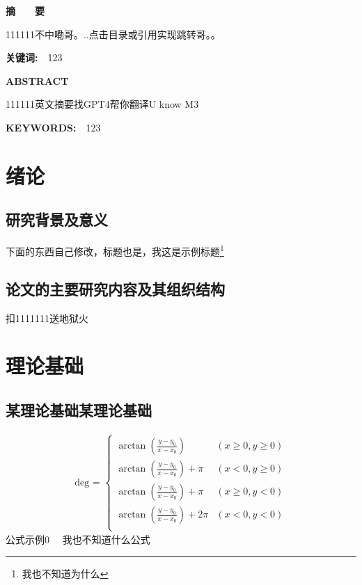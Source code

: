 \documentclass[UTF8,a4paper,12pt]{ctexart}
\begin{document}
	\begin{spacing}{1.4}
	\tableofcontents
	
	\end{spacing}
	\thispagestyle{fancy}
	\fancyfoot{}
	\newpage
	\fancyfoot[C]{\thepage} 
	 
	\centerline{\textbf{\fontsize{16pt}{\baselineskip}\heiti 摘　　要}}
	\vspace{0.4cm}
	111111不中嘞哥。..点击目录或引用实现跳转哥。。

	\vspace{0.2cm}
	\par \textbf{\fontsize{14pt}{\baselineskip}\heiti 关键词:　}123
	\setcounter{page}{1}
	\newpage
	\centerline{\textbf{\Large ABSTRACT}}
	\vspace{0.4cm}
	111111英文摘要找GPT4帮你翻译U know M3
	\vspace{0.4cm}
	\par \textbf{\large KEYWORDS:　}123
	\newpage
	\setcounter{page}{1}
	\section{绪论}
	\subsection{研究背景及意义}
	下面的东西自己修改，标题也是，我这是示例标题\footnote{我也不知道为什么}
	
	\subsection{论文的主要研究内容及其组织结构}
	扣1111111送地狱火
	
	\section{理论基础}
	
	\subsection{某理论基础某理论基础}
	\begin{equation}
		\begin{array}{c}
			\text {deg  = }\left\{\begin{array}{lc}
				\arctan (\frac{y-y_{0}}{x-x_{0}}) & (x\ge 0,y\ge 0) \\
				\arctan (\frac{y-y_{0}}{x-x_{0}})+\pi & (x<  0,y\ge 0) \\
				\arctan (\frac{y-y_{0}}{x-x_{0}})+\pi & (x\ge 0,y<  0) \\
				\arctan (\frac{y-y_{0}}{x-x_{0}})+2\pi & (x<  0,y<  0) \\
			\end{array}\right.
		\end{array}
	\end{equation}
	公式示例0  \ \  我也不知道什么公式
\end{document}
